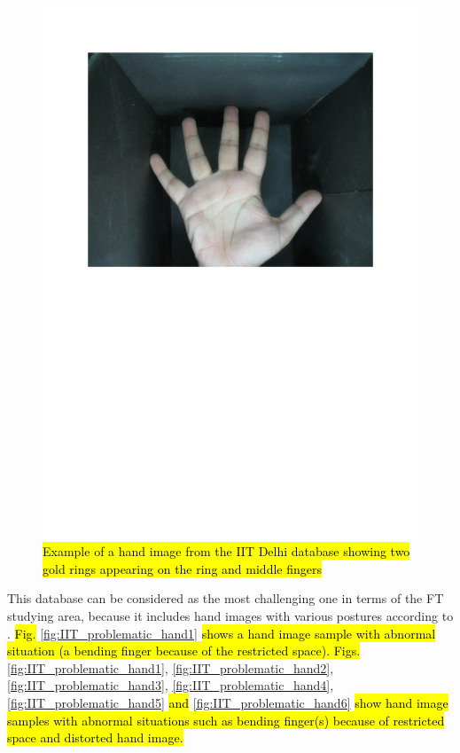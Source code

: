 \documentclass[review]{elsarticle}
\begin{document}
		\begin{figure}[!h]
			\centering
			\includegraphics[page=12,scale=.57,trim=1cm 14.7cm 1cm 1.7cm,clip]{IIT_problematic.pdf}
			\caption{\hl{Example of a hand image from the IIT Delhi database showing two gold rings appearing on the ring and middle fingers}}
			\label{fig:IIT_problematic_rings4}
		\end{figure}

	This database can be considered as the most challenging one in terms of the FT studying area, because it includes hand images with various postures according to \cite{kumar2008incorporating,kumar2011personal}. 	
	\hl{Fig.} \ref{fig:IIT_problematic_hand1} \hl{shows a hand image sample with abnormal situation (a bending finger because of the restricted space).
	Figs.} \ref{fig:IIT_problematic_hand1}, \ref{fig:IIT_problematic_hand2}, \ref{fig:IIT_problematic_hand3}, \ref{fig:IIT_problematic_hand4}, \ref{fig:IIT_problematic_hand5} \hl{and} \ref{fig:IIT_problematic_hand6} \hl{show hand image samples with abnormal situations such as bending finger(s) because of restricted space and distorted hand image.}
	
\end{document}
